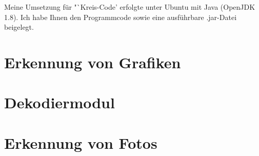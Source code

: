 \documentclass[parskip=full]{scrreprt}
\newcommand{\task}[1]{Kreis-Code}
\begin{document}
	\titlehead{Teilnahme 6745 (Team 00001) \hfill Laurenz Grote}
	\title{\task}
	\subtitle{Aufgabe 3}
	\author{Laurenz Friedrich Grote}
	\date{}
	\publishers{		
		\centering
		\texttt{[image: frontmatter.png]}
	}
	\maketitle
	\tableofcontents
	\vspace {2em}
	Meine Umsetzung für "`\task"' erfolgte unter Ubuntu mit Java (OpenJDK 1.8). Ich habe Ihnen den Programmcode sowie eine ausführbare .jar-Datei beigelegt.
	\pagebreak
	\chapter{Erkennung von Grafiken}
		
	\chapter{Dekodiermodul}
		
	\chapter{Erkennung von Fotos}
		
\end{document}
